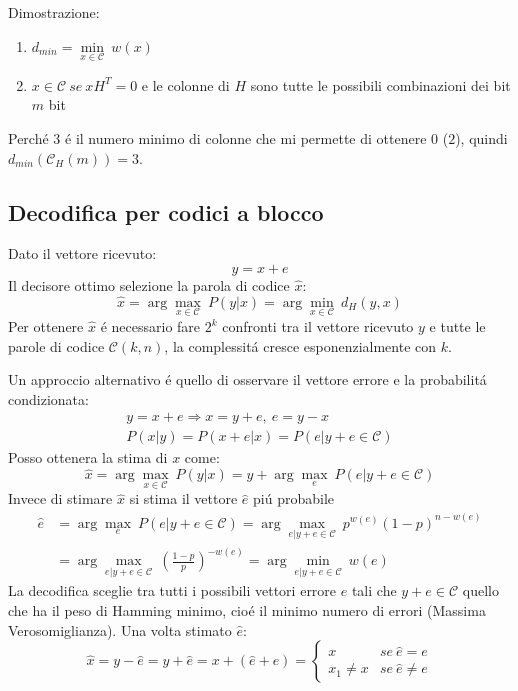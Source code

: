         \noindent Dimostrazione: 
        \begin{enumerate}
            \item {
                $d_{min} = \underset{x\in\mathcal{C}}{\min}\ w(x)$  
            }
            \item {
                $x\in\mathcal{C}\ se\ xH^T= 0$ e le colonne di $H$ sono tutte le possibili combinazioni dei bit $m$ bit
            }
        \end{enumerate}
        Perché $3$ é il numero minimo di colonne che mi permette di ottenere $0$ ($2$), quindi $d_{min}(\mathcal{C}_H(m)) = 3$.
        
    \subsection{Decodifica per codici a blocco}
        Dato il vettore ricevuto:
        \[
            y = x+e
        \]
        Il decisore ottimo selezione la parola di codice $\hat{x}$:
        \[
            \hat{x} = \arg \underset{x\in\mathcal{C}}{\max}\ P(y|x) = \arg \underset{x\in\mathcal{C}}{\min}\ d_H(y,x)   
        \]
        Per ottenere $\hat{x}$ é necessario fare $2^k$ confronti tra il vettore ricevuto $y$ e tutte le parole di codice $\mathcal{C}(k,n)$, 
        la complessitá cresce esponenzialmente con $k$.

        Un approccio alternativo é quello di osservare il vettore errore e la probabilitá condizionata:
        \begin{gather}
            y= x+e \Rightarrow x = y+e,\ e = y-x\nonumber\\
            P(x|y) = P(x+e|x) = P(e|y+e\in\mathcal{C})\nonumber
        \end{gather}
        Posso ottenera la stima di $x$ come:
        \[
            \hat{x} = \arg \underset{x\in\mathcal{C}}{\max}\ P(y|x) =y+ \arg \underset{e}{\max}\ P(e|y+e\in\mathcal{C})   
        \]
        Invece di stimare $\hat{x}$ si stima il vettore $\hat{e}$ piú probabile
        \begin{align}
            \hat{e} &= \arg \underset{e}{\max}\ P(e|y+e\in\mathcal{C}) = \arg \underset{e|y+e\in\mathcal{C}}{\max}\ p^{w(e)}(1-p)^{n-w(e)} \nonumber \\
                    &= \arg \underset{e|y+e\in\mathcal{C}}{\max}\ \left(\frac{1-p}{p}\right)^{-w(e)} = \arg \underset{e|y+e\in\mathcal{C}}{\min}\ w(e)  \nonumber 
        \end{align}
        La decodifica sceglie tra tutti i possibili vettori errore $e$ tali che $y+e\in\mathcal{C}$ quello che ha il peso di Hamming minimo, cioé il minimo numero di 
        errori (Massima Verosomiglianza). Una volta stimato $\hat{e}$:
        \[
            \hat{x} = y-\hat{e} = y+\hat{e} = x+(\hat{e}+e)=
            \begin{cases}
                x &se\ \hat{e} = e\nonumber\\    
                x_1\neq x &se\ \hat{e} \neq e\nonumber    
            \end{cases}     
        \]
